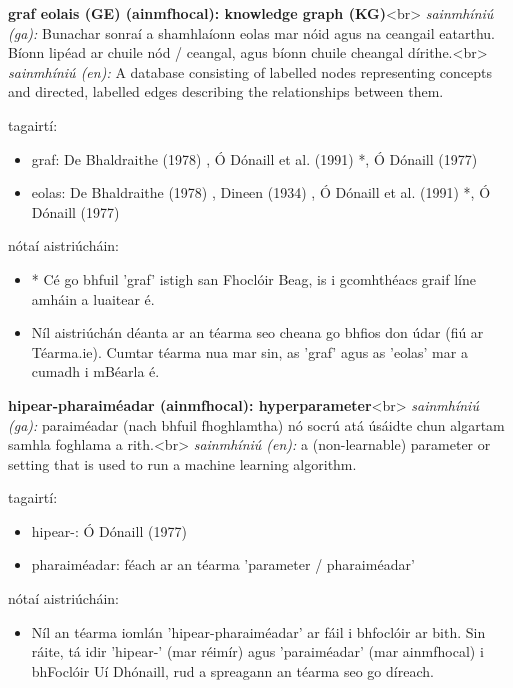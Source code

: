 \documentclass{article}
\begin{document}
\textbf{graf eolais (GE) (ainmfhocal): knowledge graph (KG)}<br>
\textit{sainmhíniú (ga):} Bunachar sonraí a shamhlaíonn eolas mar nóid agus na ceangail eatarthu. Bíonn lipéad ar chuile nód / ceangal, agus bíonn chuile cheangal dírithe.<br>
\textit{sainmhíniú (en):} A database consisting of labelled nodes representing concepts and directed, labelled edges describing the relationships between them.

tagairtí:
\begin{itemize}
	\item graf: De Bhaldraithe (1978) \cite{de-bhaldraithe}, Ó Dónaill et al. (1991) \cite{focloir-beag}*, Ó Dónaill (1977) \cite{odonaill}
	\item eolas: De Bhaldraithe (1978) \cite{de-bhaldraithe}, Dineen (1934) \cite{dineen}, Ó Dónaill et al. (1991) \cite{focloir-beag}*, Ó Dónaill (1977) \cite{odonaill}
\end{itemize}

nótaí aistriúcháin:
\begin{itemize}
	\item * Cé go bhfuil 'graf' istigh san Fhoclóir Beag, is i gcomhthéacs graif líne amháin a luaitear é.
	\item Níl aistriúchán déanta ar an téarma seo cheana go bhfios don údar (fiú ar Téarma.ie). Cumtar téarma nua mar sin, as 'graf' agus as 'eolas' mar a cumadh i mBéarla é.
\end{itemize}


\textbf{hipear-pharaiméadar (ainmfhocal): hyperparameter}<br>
\textit{sainmhíniú (ga):} paraiméadar (nach bhfuil fhoghlamtha) nó socrú atá úsáidte chun algartam samhla foghlama a rith.<br>
\textit{sainmhíniú (en):} a (non-learnable) parameter or setting that is used to run a machine learning algorithm.

tagairtí:
\begin{itemize}
	\item hipear-: Ó Dónaill (1977) \cite{odonaill}
	\item pharaiméadar: féach ar an téarma 'parameter / pharaiméadar'
\end{itemize}

nótaí aistriúcháin:
\begin{itemize}
	\item Níl an téarma iomlán 'hipear-pharaiméadar' ar fáil i bhfoclóir ar bith. Sin ráite, tá idir 'hipear-' (mar réimír) agus 'paraiméadar' (mar ainmfhocal) i bhFoclóir Uí Dhónaill, rud a spreagann an téarma seo go díreach.
\end{itemize}
\end{document}
